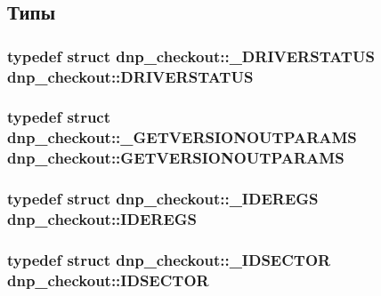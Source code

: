 \subsection{Типы}
\hypertarget{namespacednp__checkout_a4a8d9b7c57ae5e7d0d88f7a5be282c57}{
\subsubsection[{D\-R\-I\-V\-E\-R\-S\-T\-A\-T\-U\-S}]{\setlength{\rightskip}{0pt plus 5cm}typedef struct {\bf dnp\-\_\-checkout\-::\-\_\-\-D\-R\-I\-V\-E\-R\-S\-T\-A\-T\-U\-S}  {\bf dnp\-\_\-checkout\-::\-D\-R\-I\-V\-E\-R\-S\-T\-A\-T\-U\-S}}}\label{namespacednp__checkout_a4a8d9b7c57ae5e7d0d88f7a5be282c57}
\hypertarget{namespacednp__checkout_a97d39a4b0d5b567ee5c8862d0e712d46}{
\subsubsection[{G\-E\-T\-V\-E\-R\-S\-I\-O\-N\-O\-U\-T\-P\-A\-R\-A\-M\-S}]{\setlength{\rightskip}{0pt plus 5cm}typedef struct {\bf dnp\-\_\-checkout\-::\-\_\-\-G\-E\-T\-V\-E\-R\-S\-I\-O\-N\-O\-U\-T\-P\-A\-R\-A\-M\-S}  {\bf dnp\-\_\-checkout\-::\-G\-E\-T\-V\-E\-R\-S\-I\-O\-N\-O\-U\-T\-P\-A\-R\-A\-M\-S}}}\label{namespacednp__checkout_a97d39a4b0d5b567ee5c8862d0e712d46}
\hypertarget{namespacednp__checkout_ad6ca05b19c9b8b1d79306987d943d841}{
\subsubsection[{I\-D\-E\-R\-E\-G\-S}]{\setlength{\rightskip}{0pt plus 5cm}typedef struct {\bf dnp\-\_\-checkout\-::\-\_\-\-I\-D\-E\-R\-E\-G\-S}  {\bf dnp\-\_\-checkout\-::\-I\-D\-E\-R\-E\-G\-S}}}\label{namespacednp__checkout_ad6ca05b19c9b8b1d79306987d943d841}
\hypertarget{namespacednp__checkout_a778f09eed45cfcd63f3039c57a7112f4}{
\subsubsection[{I\-D\-S\-E\-C\-T\-O\-R}]{\setlength{\rightskip}{0pt plus 5cm}typedef struct {\bf dnp\-\_\-checkout\-::\-\_\-\-I\-D\-S\-E\-C\-T\-O\-R}  {\bf dnp\-\_\-checkout\-::\-I\-D\-S\-E\-C\-T\-O\-R}}}\label{namespacednp__checkout_a778f09eed45cfcd63f3039c57a7112f4}
